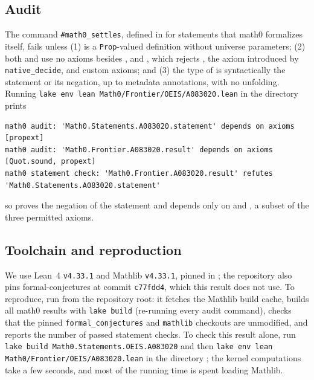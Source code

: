 \documentclass[11pt]{amsart}
\theoremstyle{plain}
\theoremstyle{definition}
\begin{document}
\subsection*{Audit}
The command \texttt{\#math0\_settles}, defined in  for statements that math0 formalizes itself, fails unless (1)  is a \texttt{Prop}-valued definition without universe parameters; (2) both  and  use no axioms besides ,  and , which rejects , the axiom  introduced by \texttt{native\_decide}, and custom axioms; and (3) the type of  is syntactically the statement or its negation, up to metadata annotations, with no unfolding.
Running \texttt{lake env lean Math0/Frontier/OEIS/A083020.lean} in the directory  prints\par\nobreak\noindent
\begin{minipage}{\linewidth}
\begin{lstlisting}[basicstyle=\ttfamily\scriptsize]
math0 audit: 'Math0.Statements.A083020.statement' depends on axioms [propext]
math0 audit: 'Math0.Frontier.A083020.result' depends on axioms [Quot.sound, propext]
math0 statement check: 'Math0.Frontier.A083020.result' refutes 'Math0.Statements.A083020.statement'
\end{lstlisting}
\end{minipage}
so  proves the negation of the statement and depends only on  and , a subset of the three permitted axioms.

\subsection*{Toolchain and reproduction}
We use Lean~4 \cite{Lean4} \texttt{v4.33.1} and Mathlib \cite{Mathlib} \texttt{v4.33.1}, pinned in ; the repository also pins formal-conjectures \cite{FC} at commit \texttt{c77fdd4}, which this result does not use.
To reproduce, run  from the repository root: it fetches the Mathlib build cache, builds all math0 results with \texttt{lake build} (re-running every audit command), checks that the pinned \texttt{formal\_conjectures} and \texttt{mathlib} checkouts are unmodified, and reports the number of passed statement checks.
To check this result alone, run \texttt{lake build Math0.Statements.OEIS.A083020} and then \texttt{lake env lean Math0/Frontier/OEIS/A083020.lean} in the directory ; the kernel computations take a few seconds, and most of the running time is spent loading Mathlib.
\end{document}
